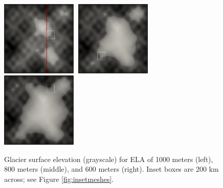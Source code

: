 \documentclass[]{interact}
\theoremstyle{plain}%
\theoremstyle{definition}
\theoremstyle{remark}
\begin{document}
\begin{figure}[ht]
\centering

\mbox{\includegraphics[width=0.32\textwidth]{static/glacier/surf1000.png} \,\includegraphics[width=0.32\textwidth]{static/glacier/surf800.png} \,\includegraphics[width=0.32\textwidth]{static/glacier/surf600.png}}
\caption{Glacier surface elevation (grayscale) for ELA of 1000 meters (left), 800 meters (middle), and 600 meters (right).  Inset boxes are 200 km across; see Figure \ref{fig:insetmeshes}.}
\label{fig:glacier}
\end{figure}
\end{document}
